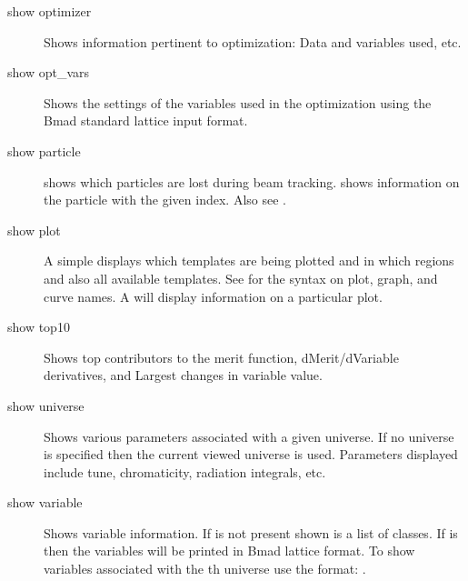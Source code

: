 {\begin{description}
  \item[show optimizer]
Shows information pertinent to optimization: Data and variables used, etc.

  \item[show opt\_vars]
Shows the settings of the variables used in the optimization using the 
Bmad standard lattice input format.

  \item[show particle]
 shows which particles are lost during beam
tracking.  shows information on the particle
with the given index. Also see .

  \item[show plot]
A simple  displays which templates are being plotted and
in which regions and also all available templates. See
 for the syntax on plot, graph, and curve names. A
 will display information on a particular
plot.

  \item[show top10]
Shows top contributors to the merit function, dMerit/dVariable
derivatives, and Largest changes in variable value.

  \item[show universe]
Shows various parameters associated with a given universe. If no
universe is specified then the current viewed universe is
used. Parameters displayed include tune, chromaticity, radiation
integrals, etc.

  \item[show variable]
Shows variable information. If   is not
present shown is a list of  classes. If  is
\vn{*} then the variables will be printed in Bmad lattice format.
To show variables associated with the th universe use
the format: .

\end{description}

}

